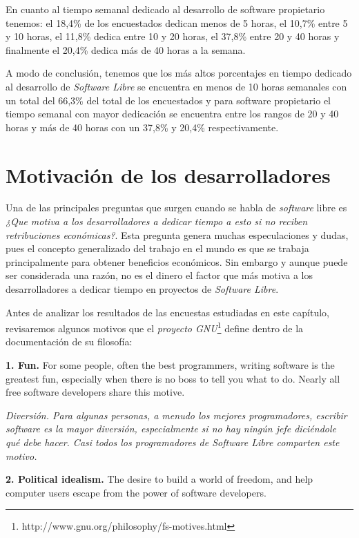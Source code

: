 En cuanto al tiempo semanal dedicado al desarrollo de software propietario tenemos: el 18,4\% de los encuestados dedican menos de 5 horas, el 10,7\% entre 5 y 10 horas, el 11,8\% dedica entre 10 y 20 horas, el 37,8\% entre 20 y 40 horas y finalmente el 20,4\% dedica más de 40 horas a la semana.

A modo de conclusión, tenemos que los más altos porcentajes en tiempo dedicado al desarrollo de \textit{Software Libre} se encuentra en menos de 10 horas  semanales con un total del 66,3\% del total de los encuestados y para software propietario el tiempo semanal con mayor dedicación se encuentra entre los rangos de 20 y 40 horas y más de 40 horas con un 37,8\% y 20,4\% respectivamente.

\section{Motivación de los desarrolladores}

Una de las principales preguntas que surgen cuando se habla de \textit{software} libre es \textit{¿Que motiva a los desarrolladores a dedicar tiempo a esto si no reciben retribuciones económicas?}. Esta pregunta genera muchas especulaciones y dudas, pues el concepto generalizado del trabajo en el mundo es que se trabaja principalmente para obtener beneficios económicos. Sin embargo y aunque puede ser considerada una razón, no es el dinero el factor que más motiva a los desarrolladores a dedicar tiempo en proyectos de \textit{Software Libre}.

Antes de analizar los resultados de  las encuestas estudiadas en este capítulo, revisaremos algunos motivos que el \textit{proyecto GNU}\footnote{ http://www.gnu.org/philosophy/fs-motives.html } define dentro de la documentación de su filosofía:

{\bf 1. Fun.} For some people, often the best programmers, writing software is the greatest fun, especially when there is no boss to tell you what to do. Nearly all free software developers share this motive.

\textit{Diversión. Para algunas personas, a menudo los mejores programadores, escribir software es la mayor diversión, especialmente si no hay ningún jefe diciéndole qué debe hacer. Casi todos los programadores de \textit{Software Libre} comparten este motivo.}\vspace{0.4cm} 

{\bf 2. Political idealism.} The desire to build a world of freedom, and help computer users escape from the power of software developers.

